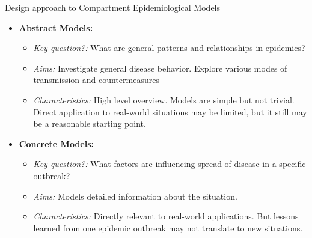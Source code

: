 \begin{frame}{Design approach to Compartment Epidemiological Models}
  \begin{itemize}
    \item \textbf{Abstract Models:} 
    \begin{itemize}
      \item \textit{Key question?:} What are general patterns and relationships in epidemics?
      \item \textit{Aims:} Investigate general disease behavior. Explore various modes of transmission and countermeasures
      \item \textit{Characteristics:} High level overview. Models are simple but not trivial. Direct application to real-world situations may be limited, but it still may be a reasonable starting point.
    \end{itemize}

    \pause
    
    \item \textbf{Concrete Models:}
    \begin{itemize}
       \item \textit{Key question?:} What factors are influencing spread of disease in a specific outbreak?
        \item \textit{Aims:} Models detailed information about the situation.
      \item \textit{Characteristics:} Directly relevant to real-world applications. But lessons learned from one epidemic outbreak may not translate to new situations.
     
    \end{itemize}
  \end{itemize}
\end{frame}


